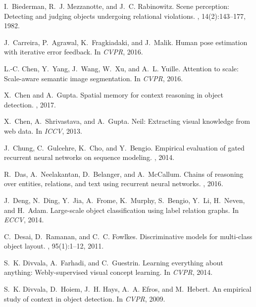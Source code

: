 \documentclass[10pt,twocolumn,letterpaper]{article}
\begin{document}
{\small

\begin{thebibliography}{10}\itemsep=-1pt

I.~Biederman, R.~J. Mezzanotte, and J.~C. Rabinowitz.
\newblock Scene perception: Detecting and judging objects undergoing relational
  violations.
, 14(2):143--177, 1982.

J.~Carreira, P.~Agrawal, K.~Fragkiadaki, and J.~Malik.
\newblock Human pose estimation with iterative error feedback.
\newblock In {\em CVPR}, 2016.

L.-C. Chen, Y.~Yang, J.~Wang, W.~Xu, and A.~L. Yuille.
\newblock Attention to scale: Scale-aware semantic image segmentation.
\newblock In {\em CVPR}, 2016.

X.~Chen and A.~Gupta.
\newblock Spatial memory for context reasoning in object detection.
, 2017.

X.~Chen, A.~Shrivastava, and A.~Gupta.
\newblock Neil: Extracting visual knowledge from web data.
\newblock In {\em ICCV}, 2013.

J.~Chung, C.~Gulcehre, K.~Cho, and Y.~Bengio.
\newblock Empirical evaluation of gated recurrent neural networks on sequence
  modeling.
, 2014.

R.~Das, A.~Neelakantan, D.~Belanger, and A.~McCallum.
\newblock Chains of reasoning over entities, relations, and text using
  recurrent neural networks.
, 2016.

J.~Deng, N.~Ding, Y.~Jia, A.~Frome, K.~Murphy, S.~Bengio, Y.~Li, H.~Neven, and
  H.~Adam.
\newblock Large-scale object classification using label relation graphs.
\newblock In {\em ECCV}, 2014.

C.~Desai, D.~Ramanan, and C.~C. Fowlkes.
\newblock Discriminative models for multi-class object layout.
, 95(1):1--12, 2011.

S.~K. Divvala, A.~Farhadi, and C.~Guestrin.
\newblock Learning everything about anything: Webly-supervised visual concept
  learning.
\newblock In {\em CVPR}, 2014.

S.~K. Divvala, D.~Hoiem, J.~H. Hays, A.~A. Efros, and M.~Hebert.
\newblock An empirical study of context in object detection.
\newblock In {\em CVPR}, 2009.


\end{thebibliography}}
\end{document}
